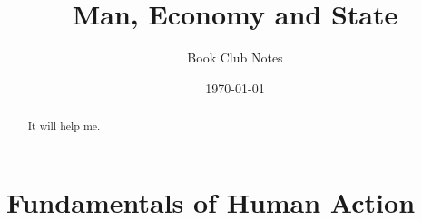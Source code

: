 \documentclass[]{article}
\begin{document}
\title{Man, Economy and State}
\author{Book Club Notes}
\date{\today}

\maketitle

\begin{abstract}
It will help me.
\end{abstract}

\section{Fundamentals of Human Action}
\end{document}
